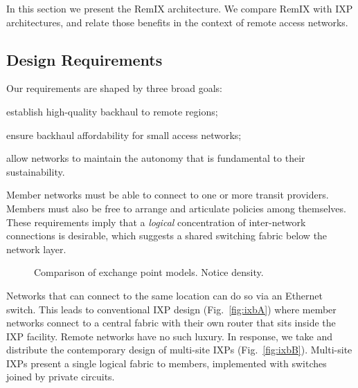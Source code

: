In this section we present the RemIX architecture. We compare RemIX with IXP architectures, and relate those
benefits in the context of remote access networks.

\subsection{Design Requirements}

Our requirements are shaped by three broad goals:
\begin{inparaenum}[(i)]
  \item establish high-quality backhaul to remote regions;
  \item ensure backhaul affordability for small access networks;
  \item allow networks to maintain the autonomy that is
    fundamental to their sustainability.
\end{inparaenum}
Member networks must be able to connect to one or more transit
providers. Members must also be free to arrange and articulate
policies among themselves. These requirements imply that a
\emph{logical} concentration of inter-network connections is
desirable, which suggests a shared switching fabric below the network
layer.

\begin{figure*}
   \hfill
   \hfill
  \subfloat[RemIX]{
    \resizebox{0.45\columnwidth}{!}{
      \begin{tikzpicture}
        \ixboxesC
      \end{tikzpicture}
      \label{fig:ixbC}
    }
  }
  \caption{Comparison of exchange point models. Notice density.}
  \label{fig:ixb}
\end{figure*}

Networks that can connect to the same location can do so
via an Ethernet switch. This leads to conventional \ac{IXP}
design (Fig.~\ref{fig:ixbA}) where member networks connect to a
central fabric with their own router that sits inside the IXP
facility. Remote networks have no such luxury. In response, we
take and distribute the contemporary design of multi-site \acp{IXP}
(Fig.~\ref{fig:ixbB}). Multi-site \acp{IXP} present a single
logical fabric to members, implemented with switches
joined by private circuits.


